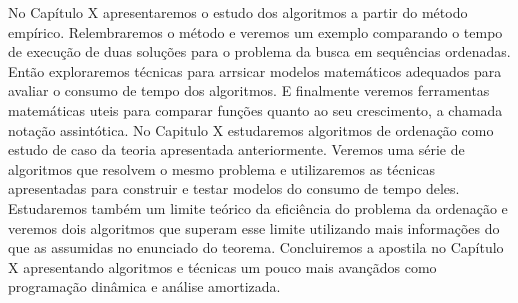 No Capítulo X apresentaremos o estudo dos algoritmos a partir do método empírico.
Relembraremos o método e veremos um exemplo comparando o tempo de execução de duas soluções para o problema da busca em sequências ordenadas.
Então exploraremos técnicas para arrsicar modelos matemáticos adequados para avaliar o consumo de tempo dos algoritmos.
E finalmente veremos ferramentas matemáticas uteis para comparar funções quanto ao seu crescimento, a chamada notação assintótica.
No Capitulo X estudaremos algoritmos de ordenação como estudo de caso da teoria apresentada anteriormente.
Veremos uma série de algoritmos que resolvem o mesmo problema e utilizaremos as técnicas apresentadas para construir e testar modelos do consumo de tempo deles.
Estudaremos também um limite teórico da eficiência do problema da ordenação e veremos dois algoritmos que superam esse limite utilizando mais informações do que as assumidas no enunciado do teorema.
Concluiremos a apostila no Capítulo X apresentando algoritmos e técnicas um pouco mais avançãdos como programação dinâmica e análise amortizada.

